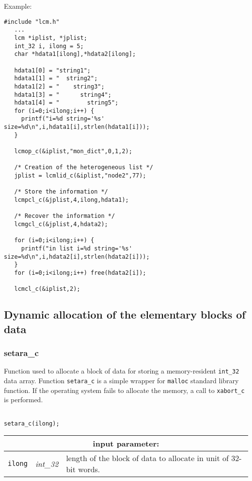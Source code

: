 \noindent Example:
\begin{verbatim}
#include "lcm.h"
   ...
   lcm *iplist, *jplist;
   int_32 i, ilong = 5;
   char *hdata1[ilong],*hdata2[ilong];

   hdata1[0] = "string1";
   hdata1[1] = "  string2";
   hdata1[2] = "    string3";
   hdata1[3] = "      string4";
   hdata1[4] = "        string5";
   for (i=0;i<ilong;i++) {
     printf("i=%d string='%s' size=%d\n",i,hdata1[i],strlen(hdata1[i]));
   }

   lcmop_c(&iplist,"mon_dict",0,1,2);

   /* Creation of the heterogeneous list */
   jplist = lcmlid_c(&iplist,"node2",77);

   /* Store the information */
   lcmpcl_c(&jplist,4,ilong,hdata1);

   /* Recover the information */
   lcmgcl_c(&jplist,4,hdata2);

   for (i=0;i<ilong;i++) {
     printf("in list i=%d string='%s' size=%d\n",i,hdata2[i],strlen(hdata2[i]));
   }
   for (i=0;i<ilong;i++) free(hdata2[i]);

   lcmcl_c(&iplist,2);
\end{verbatim}

\subsection{Dynamic allocation of the elementary blocks of data}

\subsubsection{setara\_c}\label{sect:setara}

Function used to allocate a block of data for storing a memory-resident {\tt int\_32} data array.
Function {\tt setara\_c} is a simple wrapper for {\tt malloc} standard library function.
If the operating system fails to allocate the memory, a call to {\tt xabort\_c} is performed.

\begin{verbatim}

setara_c(ilong);
\end{verbatim}

\noindent
\begin{tabular}{|p{1.5cm}|p{2cm}|p{11cm}|}
\hline
\multicolumn{3}{|c|}{\bf input parameter:} \\
\hline
{\tt ilong} & {\it int\_32} & length of the block of data to allocate in unit of 32-bit words. \\
\hline
\end{tabular}


